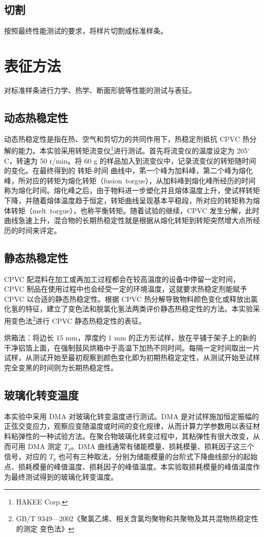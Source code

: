 \documentclass[a4paper, oneside, onecolumn, 12pt]{ctexrep}    %
\newcommand{\cd}{$^{\circ}$C}  %
\begin{document}
\subsection{切割}
按照最终性能测试的要求，将样片切割成标准样条。


\section{表征方法}
对标准样条进行力学、热学、断面形貌等性能的测试与表征。

\subsection{动态热稳定性}
动态热稳定性是指在热、空气和剪切力的共同作用下，热稳定剂抵抗 CPVC 热分解的能力。本实验采用转矩流变仪\footnote{HAKEE Corp.}进行测试。首先将流变仪的温度设定为 205\cd，转速为 50 r/min。将 60 g 的样品加入到流变仪中，记录流变仪的转矩随时间的变化。在最终得到的 转矩-时间 曲线中，笫一个峰为加料峰，第二个峰为熔化峰，所对应的转矩为熔化转矩（fusion torgue），从加料峰到熔化峰所经历的时间称为熔化时间。熔化峰之后，由于物料进一步塑化并且熔体温度上升，使试样转矩下降，并随着熔体温度趋于恒定，转矩曲线呈现基本平稳段，所对应的转矩称为熔体转矩（melt torgue），也称平衡转矩。随着试验的继续，CPVC 发生分解，此时曲线急速上升，混合物的长期热稳定性就是根据从熔化转矩到转矩突然增大点所经历的时间来评定。

\subsection{静态热稳定性}
CPVC 配混料在加工或再加工过程都会在较高温度的设备中停留一定时间，CPVC 制品在使用过程中也会经受一定的环境温度，这就要求热稳定剂能赋予 CPVC 以合适的静态热稳定性。根据 CPVC 热分解导致物料颜色变化或释放出氯化氢的特征，建立了变色法和脱氯化氢法两类评价静态热稳定性的方法。本实验采用变色法\footnote{GB/T 9349—2002《聚氯乙烯、相关含氯均聚物和共聚物及其共混物热稳定性的测定 变色法》}进行 CPVC 静态热稳定性的表征。\par
烘箱法：将边长 15 mm，厚度约 1 mm 的正方形试样，放在平铺于架子上的新的干净铝箔上面，在强制鼓风烘箱中于高温下加热不同时间。每隔一定时间取出一片试样，从测试开始至最初观察到颜色变化即为初期热稳定定性，从测试开始至试样完全变黑的时间则为长期热稳定性。

\subsection{玻璃化转变温度}
本实验中采用 DMA 对玻璃化转变温度进行测试。DMA 是对试样施加恒定振幅的正弦交变应力，观察应变随温度或时间的变化规律，从而计算力学参数用以表征材料粘弹性的一种试验方法。在聚合物玻璃化转变过程中，其粘弹性有很大改变，从而可用 DMA 测定 $T_g$。DMA 曲线通常有储能模量、损耗模量、损耗因子这三个信号，对应的 $T_g$ 也可有三种取法，分别为储能模量的台阶式下降曲线部分的起始点、损耗模量的峰值温度、损耗因子的峰值温度。本实验取损耗模量的峰值温度作为最终测试得到的玻璃化转变温度。
\end{document}
